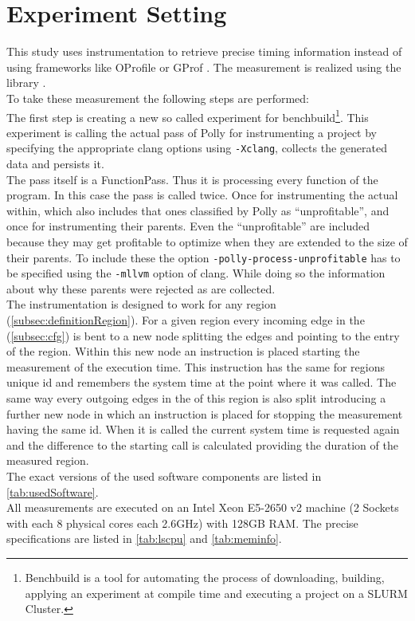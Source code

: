 \section{Experiment Setting}\label{sec:experimentSettings}
\begin{sloppypar}
    This study uses instrumentation to retrieve precise timing information instead of using frameworks like OProfile \cite{oprofile} or GProf \cite{gprof}.
    The measurement is realized using the \papi library \cite{papi}.\\
    To take these measurement the following steps are performed:\\
    The first step is creating a new so called experiment for benchbuild\footnote{Benchbuild is a tool for automating the process of downloading, building, applying an experiment at compile time and executing a project on a SLURM \cite{slurm} Cluster.}.
    This experiment is calling the actual pass of Polly for instrumenting a project by specifying the appropriate clang options using \texttt{-Xclang}, collects the generated data and persists it.\\
    The pass itself is a FunctionPass.
    Thus it is processing every function of the program.
    In this case the pass is called twice.
    Once for instrumenting the actual \scops within, which also includes that ones classified by Polly as \enquote{unprofitable}, and once for instrumenting their parents.
    Even the \enquote{unprofitable} \scops are included because they may get profitable to optimize when they are extended to the size of their parents.
    To include these \scops the option \texttt{-polly-process-unprofitable} has to be specified using the \texttt{-mllvm} option of clang.
    While doing so the information about why these parents were rejected as \scops are collected.\\
    The instrumentation is designed to work for any region (\autoref{subsec:definitionRegion}).
    For a given region every incoming edge in the \cfg (\autoref{subsec:cfg}) is bent to a new node splitting the edges and pointing to the entry of the region.
    Within this new node an instruction is placed starting the measurement of the execution time.
    This instruction has the same for regions unique id and remembers the system time at the point where it was called.
    The same way every outgoing edges in the \cfg of this region is also split introducing a further new node in which an instruction is placed for stopping the measurement having the same id.
    When it is called the current system time is requested again and the difference to the starting call is calculated providing the duration of the measured region.\\
    The exact versions of the used software components are listed in \autoref{tab:usedSoftware}.\\
    All measurements are executed on an Intel Xeon E5-2650 v2 machine (2 Sockets with each 8 physical cores each 2.6GHz) with 128GB RAM.
    The precise specifications are listed in \autoref{tab:lscpu} and \autoref{tab:meminfo}.
\end{sloppypar}
